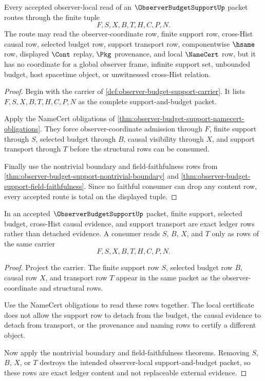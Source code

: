 \begin{theorem}
\label{thm:observer-budget-support-route-totality}
Every accepted observer-local read of an $\ObserverBudgetSupportUp$ packet routes through the finite tuple
$$
F,S,X,B,T,H,C,P,N.
$$
The route may read the observer-coordinate row, finite support row, cross-Hist causal row, selected budget row, support transport row, componentwise $\hsame$ row, displayed $\Cont$ replay, $\Pkg$ provenance, and local $\NameCert$ row, but it has no coordinate for a global observer frame, infinite support set, unbounded budget, host spacetime object, or unwitnessed cross-Hist relation.
\end{theorem}
\begin{proof}
Begin with the carrier of \autoref{def:observer-budget-support-carrier}. It lists $F,S,X,B,T,H,C,P,N$ as the complete support-and-budget packet.

Apply the NameCert obligations of \autoref{thm:observer-budget-support-namecert-obligations}. They force observer-coordinate admission through $F$, finite support through $S$, selected budget through $B$, causal visibility through $X$, and support transport through $T$ before the structural rows can be consumed.

Finally use the nontrivial boundary and field-faithfulness rows from \autoref{thm:observer-budget-support-nontrivial-boundary} and \autoref{thm:observer-budget-support-field-faithfulness}. Since no faithful consumer can drop any content row, every accepted route is total on the displayed tuple.
\end{proof}

\begin{theorem}
\label{thm:observer-budget-support-ledger-exactness}
In an accepted $\ObserverBudgetSupportUp$ packet, finite support, selected budget, cross-Hist causal evidence, and support transport are exact ledger rows rather than detached evidence. A consumer reads $S$, $B$, $X$, and $T$ only as rows of the same carrier
$$
F,S,X,B,T,H,C,P,N.
$$
\end{theorem}
\begin{proof}
Project the carrier. The finite support row $S$, selected budget row $B$, causal row $X$, and transport row $T$ appear in the same packet as the observer-coordinate and structural rows.

Use the NameCert obligations to read these rows together. The local certificate does not allow the support row to detach from the budget, the causal evidence to detach from transport, or the provenance and naming rows to certify a different object.

Now apply the nontrivial boundary and field-faithfulness theorems. Removing $S$, $B$, $X$, or $T$ destroys the intended observer-local support-and-budget packet, so these rows are exact ledger content and not replaceable external evidence.
\end{proof}

